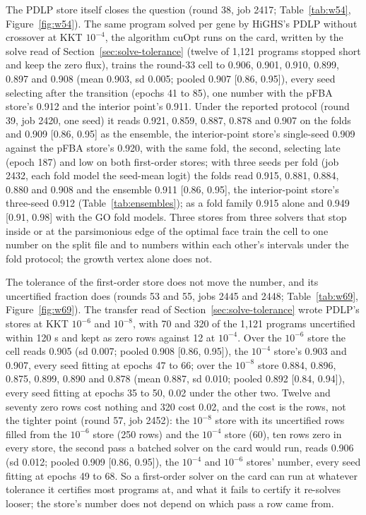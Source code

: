 The PDLP store itself closes the question (round 38, job 2417; Table~\ref{tab:w54},
Figure~\ref{fig:w54}). The same program solved per gene by HiGHS's PDLP without
crossover at KKT $10^{-4}$, the algorithm cuOpt runs on the card, written by the
solve read of Section~\ref{sec:solve-tolerance} (twelve of 1,121 programs stopped
short and keep the zero flux), trains the round-33 cell to 0.906, 0.901, 0.910,
0.899, 0.897 and 0.908 (mean 0.903, sd 0.005; pooled 0.907 [0.86, 0.95]), every
seed selecting after the transition (epochs 41 to 85), one number with the pFBA
store's 0.912 and the interior point's 0.911. Under the reported protocol (round 39,
job 2420, one seed) it reads 0.921, 0.859, 0.887, 0.878 and 0.907 on the folds and
0.909 [0.86, 0.95] as the ensemble, the interior-point store's single-seed 0.909
against the pFBA store's 0.920, with the same fold, the second, selecting late (epoch
187) and low on both first-order stores; with three seeds per fold (job 2432, each
fold model the seed-mean logit) the folds read 0.915, 0.881, 0.884, 0.880 and 0.908
and the ensemble 0.911 [0.86, 0.95], the interior-point store's three-seed 0.912
(Table~\ref{tab:ensembles}); as a fold family 0.915 alone and 0.949 [0.91, 0.98]
with the GO fold models. Three stores from three solvers that stop
inside or at the parsimonious edge of the optimal face train the cell to one number
on the split file and to numbers within each other's intervals under the fold
protocol; the growth vertex alone does not.

The tolerance of the first-order store does not move the number, and its uncertified
fraction does (rounds 53 and 55, jobs 2445 and 2448; Table~\ref{tab:w69},
Figure~\ref{fig:w69}). The transfer read of Section~\ref{sec:solve-tolerance} wrote
PDLP's stores at KKT $10^{-6}$ and $10^{-8}$, with 70 and 320 of the 1,121 programs
uncertified within 120 s and kept as zero rows against 12 at $10^{-4}$. Over the
$10^{-6}$ store the cell reads 0.905 (sd 0.007; pooled 0.908 [0.86, 0.95]), the
$10^{-4}$ store's 0.903 and 0.907, every seed fitting at epochs 47 to 66; over the
$10^{-8}$ store 0.884, 0.896, 0.875, 0.899, 0.890 and 0.878 (mean 0.887, sd 0.010;
pooled 0.892 [0.84, 0.94]), every seed fitting at epochs 35 to 50, 0.02 under the
other two. Twelve and seventy zero rows cost nothing and 320 cost 0.02, and the cost
is the rows, not the tighter point (round 57, job 2452): the $10^{-8}$ store with its
uncertified rows filled from the $10^{-6}$ store (250 rows) and the $10^{-4}$ store
(60), ten rows zero in every store, the second pass a batched solver on the card
would run, reads 0.906 (sd 0.012; pooled 0.909 [0.86, 0.95]), the $10^{-4}$ and
$10^{-6}$ stores' number, every seed fitting at epochs 49 to 68. So a first-order
solver on the card can run at whatever tolerance it certifies most programs at, and
what it fails to certify it re-solves looser; the store's number does not depend on
which pass a row came from.

